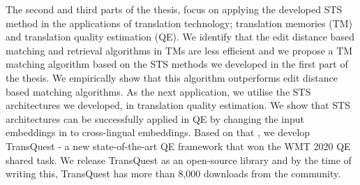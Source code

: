 The second and third parts of the thesis, focus on applying the developed STS method in the applications of translation technology; translation memories (TM) and translation quality estimation (QE). We identify that the edit distance based matching and retrieval algorithms in TMs are less efficient and we propose a TM matching algorithm based on the STS methods we developed in the first part of the thesis. We empirically show that this algorithm outperforms edit distance based matching algorithms. As the next application, we utilise the STS architectures we developed, in translation quality estimation. We show that STS architectures can be successfully applied in QE by changing the input embeddings in to cross-lingual embeddings. Based on that , we develop TransQuest - a new state-of-the-art QE framework that won the WMT 2020 QE shared task. We release TransQuest as an open-source library and by the time of writing this, TransQuest has more than 8,000 downloads from the community. 
